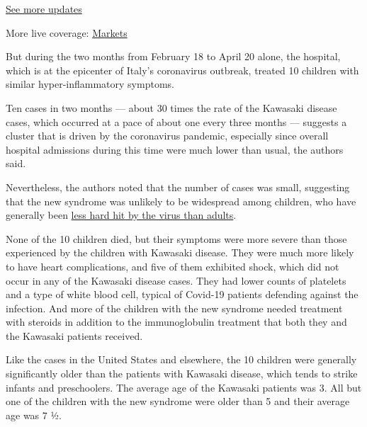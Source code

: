 \href{https://www.nytimes3xbfgragh.onion/2020/09/08/world/covid-19-coronavirus.html?action=click\&pgtype=Article\&state=default\&region=MAIN_CONTENT_1\&context=storylines_live_updates}{See
more updates}

More live coverage:
\href{https://www.nytimes3xbfgragh.onion/live/2020/09/08/business/stock-market-today-coronavirus?action=click\&pgtype=Article\&state=default\&region=MAIN_CONTENT_1\&context=storylines_live_updates}{Markets}

But during the two months from February 18 to April 20 alone, the
hospital, which is at the epicenter of Italy's coronavirus outbreak,
treated 10 children with similar hyper-inflammatory symptoms.

Ten cases in two months --- about 30 times the rate of the Kawasaki
disease cases, which occurred at a pace of about one every three months
--- suggests a cluster that is driven by the coronavirus pandemic,
especially since overall hospital admissions during this time were much
lower than usual, the authors said.

Nevertheless, the authors noted that the number of cases was small,
suggesting that the new syndrome was unlikely to be widespread among
children, who have generally been
\href{https://www.nytimes3xbfgragh.onion/2020/04/06/health/coronavirus-children-us.html}{less
hard hit by the virus than adults}.

None of the 10 children died, but their symptoms were more severe than
those experienced by the children with Kawasaki disease. They were much
more likely to have heart complications, and five of them exhibited
shock, which did not occur in any of the Kawasaki disease cases. They
had lower counts of platelets and a type of white blood cell, typical of
Covid-19 patients defending against the infection. And more of the
children with the new syndrome needed treatment with steroids in
addition to the immunoglobulin treatment that both they and the Kawasaki
patients received.

Like the cases in the United States and elsewhere, the 10 children were
generally significantly older than the patients with Kawasaki disease,
which tends to strike infants and preschoolers. The average age of the
Kawasaki patients was 3. All but one of the children with the new
syndrome were older than 5 and their average age was 7 ½.

\href{https://www.nytimes3xbfgragh.onion/news-event/coronavirus?action=click\&pgtype=Article\&state=default\&region=MAIN_CONTENT_3\&context=storylines_faq}{}

